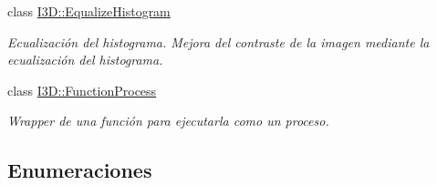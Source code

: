 \begin{DoxyCompactItemize}
class \hyperlink{class_i3_d_1_1_equalize_histogram}{I3\+D\+::\+Equalize\+Histogram}
\begin{DoxyCompactList}\small\item\em Ecualización del histograma. Mejora del contraste de la imagen mediante la ecualización del histograma. \end{DoxyCompactList}\item 
class \hyperlink{class_i3_d_1_1_function_process}{I3\+D\+::\+Function\+Process}
\begin{DoxyCompactList}\small\item\em Wrapper de una función para ejecutarla como un proceso. \end{DoxyCompactList}\end{DoxyCompactItemize}
\subsection*{Enumeraciones}
